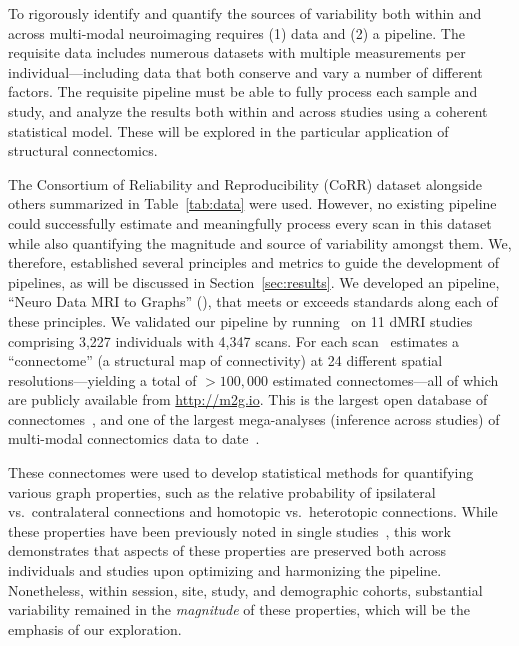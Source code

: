 \documentclass[11pt]{article}
\begin{document}
\begin{multicols}{2}
To rigorously identify and quantify the sources of variability both within and across  multi-modal neuroimaging  requires (1) data and (2) a pipeline.
The requisite data includes numerous datasets with multiple measurements per individual---including data that both conserve and vary a number of different factors.
The requisite pipeline must be able to fully process each sample and study, and analyze the results both within and across studies using a coherent statistical model.
These will be explored in the particular application of structural connectomics.

The Consortium of Reliability and Reproducibility (CoRR) dataset alongside others summarized in Table~\ref{tab:data} were used. 
However, no existing pipeline could successfully estimate and meaningfully process every scan in this dataset while also quantifying the magnitude and source of variability amongst them.
We, therefore, established several principles and metrics to guide the development of pipelines, as will be discussed in Section~\ref{sec:results}.
We developed an pipeline, ``Neuro Data MRI to Graphs'' (\ndmg), that meets or exceeds standards along each of these principles.
We validated our pipeline by running \ndmg~on 11 dMRI studies comprising 3,227 individuals with 4,347 scans.
For each scan \ndmg~estimates  a ``connectome'' (a structural map of connectivity) at 24 different spatial resolutions---yielding a total of  $>100,000$ estimated connectomes---all of which are publicly available from \url{http://m2g.io}.
This is the largest open database of connectomes~\cite{brown2016connected}, and one of the largest mega-analyses (inference across studies) of multi-modal connectomics data to date~\cite{varoquaux2013learning, vidaurre2017discovering}. 

These connectomes were used to develop statistical methods for quantifying various graph properties, such as the relative probability of ipsilateral vs.~contralateral connections and homotopic vs.~heterotopic connections.
While these properties have been previously noted in single studies~\cite{Stark2008,Zuo2010,Gee2011}, this work demonstrates that aspects of these properties are preserved both across individuals and studies upon optimizing and harmonizing the pipeline.
Nonetheless, within session, site, study, and demographic cohorts, substantial variability remained in the \emph{magnitude} of these properties, which will be the emphasis of our exploration.


\end{multicols}
\end{document}
